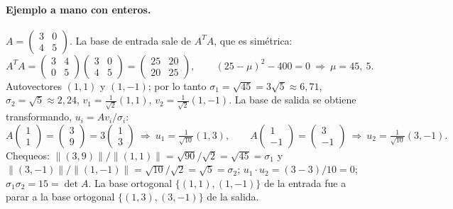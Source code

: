 \paragraph{Ejemplo a mano con enteros.} \(A=\begin{pmatrix}3&0\\4&5\end{pmatrix}\). La
base de entrada sale de \(A^TA\), que es simétrica:
\[
  A^TA=\begin{pmatrix}3&4\\0&5\end{pmatrix}\begin{pmatrix}3&0\\4&5\end{pmatrix}
  =\begin{pmatrix}25&20\\20&25\end{pmatrix},\qquad
  (25-\mu)^2-400=0\ \Rightarrow\ \mu=45,\ 5 .
\]
Autovectores \((1,1)\) y \((1,-1)\); por lo tanto \(\sigma_1=\sqrt{45}=3\sqrt5\approx6{,}71\),
\(\sigma_2=\sqrt5\approx2{,}24\), \(v_1=\tfrac1{\sqrt2}(1,1)\), \(v_2=\tfrac1{\sqrt2}(1,-1)\).
La base de salida se obtiene transformando, \(u_i=Av_i/\sigma_i\):
\[
  A\begin{pmatrix}1\\1\end{pmatrix}=\begin{pmatrix}3\\9\end{pmatrix}=3\begin{pmatrix}1\\3\end{pmatrix}
  \ \Rightarrow\ u_1=\tfrac1{\sqrt{10}}(1,3),\qquad
  A\begin{pmatrix}1\\-1\end{pmatrix}=\begin{pmatrix}3\\-1\end{pmatrix}
  \ \Rightarrow\ u_2=\tfrac1{\sqrt{10}}(3,-1).
\]
Chequeos: \(\|(3,9)\|/\|(1,1)\|=\sqrt{90}/\sqrt2=\sqrt{45}=\sigma_1\) y
\(\|(3,-1)\|/\|(1,-1)\|=\sqrt{10}/\sqrt2=\sqrt5=\sigma_2\); \(u_1\cdot u_2=(3-3)/10=0\);
\(\sigma_1\sigma_2=15=\det A\). La base ortogonal \(\{(1,1),(1,-1)\}\) de la entrada fue a
parar a la base ortogonal \(\{(1,3),(3,-1)\}\) de la salida.

